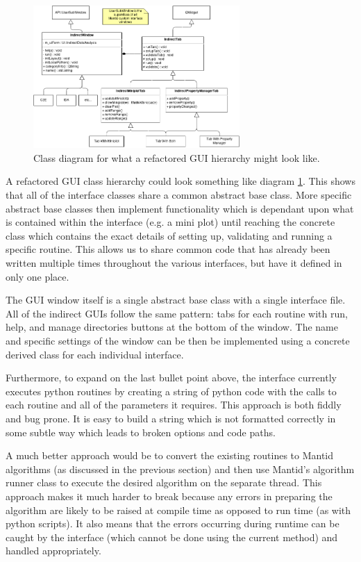 \documentclass[paper=a4, fontsize=11pt]{scrartcl}	%
\numberwithin{equation}{section}															%
\numberwithin{figure}{section}																%
\numberwithin{table}{section}																%
\begin{document}
\begin{figure}[H]
\centering
\includegraphics[width=0.7\textwidth]{img/uml/class_diagrams/IndirectGUI_structure_proposed.png}
\caption{Class diagram for what a refactored GUI hierarchy might look like.}
\label{fig:indirect-gui-proposed}
\end{figure}

A refactored GUI class hierarchy could look something like diagram \ref{fig:indirect-gui-proposed}. This shows that all of the interface classes share a common abstract base class. More specific abstract base classes then implement functionality which is dependant upon what is contained within the interface (e.g. a mini plot) until reaching the concrete class which contains the exact details of setting up, validating and running a specific routine. This allows us to share common code that has already been written multiple times throughout the various interfaces, but have it defined in only one place. 

The GUI window itself is a single abstract base class with a single interface file. All of the indirect GUIs follow the same pattern: tabs for each routine with run, help, and manage directories buttons at the bottom of the window. The name and specific settings of the window can be then be implemented using a concrete derived class for each individual interface.

Furthermore, to expand on the last bullet point above, the interface currently executes python routines by creating a string of python code with the calls to each routine and all of the parameters it requires. This approach is both fiddly and bug prone. It is easy to build a string which is not formatted correctly in some subtle way which leads to broken options and code paths.

A much better approach would be to convert the existing routines to Mantid algorithms (as discussed in the previous section) and then use Mantid's algorithm runner class to execute the desired algorithm on the separate thread. This approach makes it much harder to break because any errors in preparing the algorithm are likely to be raised at compile time as opposed to run time (as with python scripts). It also means that the errors occurring during runtime can be caught by the interface (which cannot be done using the current method) and handled appropriately. 
\end{document}
